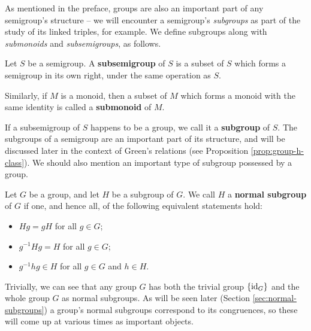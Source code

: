 As
mentioned in the preface, groups are also an important part of any semigroup's
structure -- we will encounter a semigroup's \textit{subgroups} as part of the
study of its linked triples, for example.  We define subgroups along with
\textit{submonoids} and \textit{subsemigroups}, as follows.

\begin{definition}
  \label{def:subsemigroup}
  Let $S$ be a semigroup.  A \textbf{subsemigroup} of $S$ is a subset of $S$
  which forms a semigroup in its own right, under the same operation as $S$.
\end{definition}

Similarly, if $M$ is a monoid, then a subset of $M$ which forms a monoid with
the same identity is called a \textbf{submonoid} of $M$.  

If a subsemigroup of $S$ happens to be a group, we call it a \textbf{subgroup}
of $S$.  The subgroups of a semigroup are an important part of its structure,
and will be discussed later in the context of Green's relations (see Proposition
\ref{prop:group-h-class}).  We should also mention an important type of subgroup
possessed by a group.  

\begin{definition}
  \label{def:normal-subgroup}
  Let $G$ be a group, and let $H$ be a subgroup of $G$.  We call $H$ a
  \textbf{normal subgroup} of $G$ if one, and hence all, of the following
  equivalent statements hold:
  \begin{itemize}
  \item $Hg = gH$ for all $g \in G$;
  \item $g^{-1}Hg = H$ for all $g \in G$;
  \item $g^{-1}hg \in H$ for all $g \in G$ and $h \in H$.
  \end{itemize}
\end{definition}

Trivially, we can see that any group $G$ has both the trivial group $\{\operatorname{id}_G\}$
and the whole group $G$ as normal subgroups.  As will be seen later (Section
\ref{sec:normal-subgroups}) a group's normal subgroups correspond to its
congruences, so these will come up at various times as important objects.

